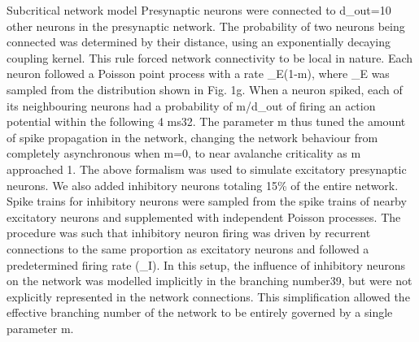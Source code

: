 Subcritical network model
Presynaptic neurons were connected to d_{out}=10 other neurons in the presynaptic network. The probability of two neurons being connected was determined by their distance, using an exponentially decaying coupling kernel. This rule forced network connectivity to be local in nature. Each neuron followed a Poisson point process with a rate \lambda_E(1-m), where \lambda_E was sampled from the distribution shown in Fig. 1g. When a neuron spiked, each of its neighbouring neurons had a probability of m/d_{out} of firing an action potential within the following 4 ms32. The parameter m thus tuned the amount of spike propagation in the network, changing the network behaviour from completely asynchronous when m=0, to near avalanche criticality as m approached 1. The above formalism was used to simulate excitatory presynaptic neurons. We also added inhibitory neurons totaling 15\% of the entire network. Spike trains for inhibitory neurons were sampled from the spike trains of nearby excitatory neurons and supplemented with independent Poisson processes. The procedure was such that inhibitory neuron firing was driven by recurrent connections to the same proportion as excitatory neurons and followed a predetermined firing rate (\lambda_I). In this setup, the influence of inhibitory neurons on the network was modelled implicitly in the branching number39, but were not explicitly represented in the network connections. This simplification allowed the effective branching number of the network to be entirely governed by a single parameter m. 

